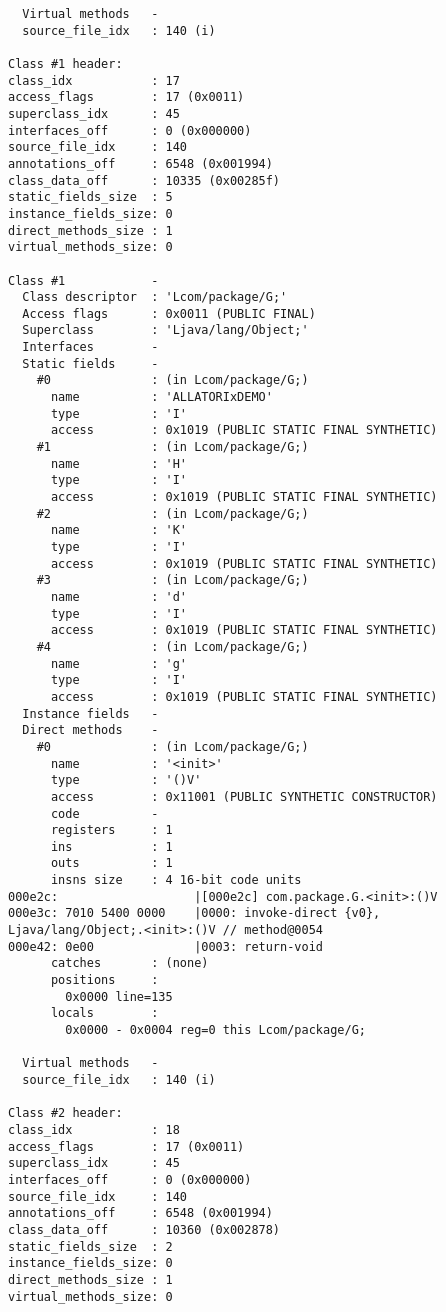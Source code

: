 \begin{lstlisting}
  Virtual methods   -
  source_file_idx   : 140 (i)

Class #1 header:
class_idx           : 17
access_flags        : 17 (0x0011)
superclass_idx      : 45
interfaces_off      : 0 (0x000000)
source_file_idx     : 140
annotations_off     : 6548 (0x001994)
class_data_off      : 10335 (0x00285f)
static_fields_size  : 5
instance_fields_size: 0
direct_methods_size : 1
virtual_methods_size: 0

Class #1            -
  Class descriptor  : 'Lcom/package/G;'
  Access flags      : 0x0011 (PUBLIC FINAL)
  Superclass        : 'Ljava/lang/Object;'
  Interfaces        -
  Static fields     -
    #0              : (in Lcom/package/G;)
      name          : 'ALLATORIxDEMO'
      type          : 'I'
      access        : 0x1019 (PUBLIC STATIC FINAL SYNTHETIC)
    #1              : (in Lcom/package/G;)
      name          : 'H'
      type          : 'I'
      access        : 0x1019 (PUBLIC STATIC FINAL SYNTHETIC)
    #2              : (in Lcom/package/G;)
      name          : 'K'
      type          : 'I'
      access        : 0x1019 (PUBLIC STATIC FINAL SYNTHETIC)
    #3              : (in Lcom/package/G;)
      name          : 'd'
      type          : 'I'
      access        : 0x1019 (PUBLIC STATIC FINAL SYNTHETIC)
    #4              : (in Lcom/package/G;)
      name          : 'g'
      type          : 'I'
      access        : 0x1019 (PUBLIC STATIC FINAL SYNTHETIC)
  Instance fields   -
  Direct methods    -
    #0              : (in Lcom/package/G;)
      name          : '<init>'
      type          : '()V'
      access        : 0x11001 (PUBLIC SYNTHETIC CONSTRUCTOR)
      code          -
      registers     : 1
      ins           : 1
      outs          : 1
      insns size    : 4 16-bit code units
000e2c:                   |[000e2c] com.package.G.<init>:()V
000e3c: 7010 5400 0000    |0000: invoke-direct {v0}, Ljava/lang/Object;.<init>:()V // method@0054
000e42: 0e00              |0003: return-void
      catches       : (none)
      positions     :
        0x0000 line=135
      locals        :
        0x0000 - 0x0004 reg=0 this Lcom/package/G;

  Virtual methods   -
  source_file_idx   : 140 (i)

Class #2 header:
class_idx           : 18
access_flags        : 17 (0x0011)
superclass_idx      : 45
interfaces_off      : 0 (0x000000)
source_file_idx     : 140
annotations_off     : 6548 (0x001994)
class_data_off      : 10360 (0x002878)
static_fields_size  : 2
instance_fields_size: 0
direct_methods_size : 1
virtual_methods_size: 0


\end{lstlisting}
